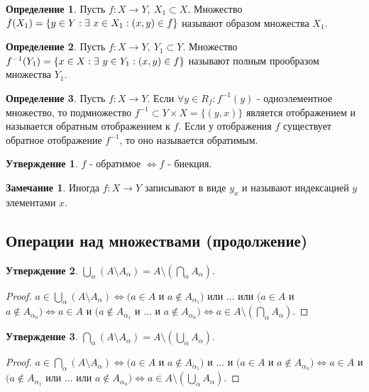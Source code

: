 \documentclass[a4paper, 12pt]{article}
\newcommand{\lra}{\Leftrightarrow}
\theoremstyle{definition}
\newtheorem*{definition}{Определение}
\newtheorem*{comm}{Замечание}
\newtheorem*{statement}{Утверждение}
\begin{document}
        \begin{definition}
            Пусть $f:X\to Y,\ X_1\subset X$. Множество $f(X_1)=\\ \{y\in Y: \exists\ x\in X_1 : (x,y)\in f\}$ называют образом множества $X_1$.
        \end{definition}
        \begin{definition}
            Пусть $f:X\to Y,\ Y_1\subset Y$. Множество $f^{-1}(Y_1)=\\ \{x\in X: \exists\ y\in Y_1 : (x,y)\in f\}$ называют полным прообразом множества $Y_1$.
        \end{definition}
        \begin{definition}
            Пусть $f:X\to Y$. Если $\forall y\in R_f: f^{-1}(y)$ - одноэлементное множество, то подмножество $f^{-1}\subset Y\times X=\{(y,x)\}$ является отображением и называется обратным отображением к $f$. Если у отображения $f$ существует обратное отображение $f^{-1}$, то оно называется обратимым.
        \end{definition}
        \begin{statement}
            $f$ - обратимое $\lra f$ - биекция.
        \end{statement}
        \begin{comm}
        Иногда $f: X\to Y$ записывают в виде $y_x$ и называют индексацией $y$ элементами $x$.
        \end{comm}
    \subsection{Операции над множествами (продолжение)}
        \begin{statement}
            $\bigcup\limits_{\alpha}(A\setminus A_{\alpha}) = A\setminus (\bigcap\limits_{\alpha}A_{\alpha})$.
        \end{statement}
        \begin{proof}
            $a\in \bigcup\limits_{\alpha}(A\setminus A_{\alpha})\lra (a\in A$ и $a\notin A_{\alpha_1})$ или $\dots$ или $(a\in A$ и $a\notin A_{\alpha_n})\lra a\in A$ и $(a\notin A_{\alpha_1}$ и $\dots$ и $a\notin A_{\alpha_n})\lra a\in A\setminus (\bigcap\limits_{\alpha}A_{\alpha})$.
        \end{proof}
        \begin{statement}
            $\bigcap\limits_{\alpha}(A\setminus A_{\alpha}) = A\setminus (\bigcup\limits_{\alpha}A_{\alpha})$.
        \end{statement}
        \begin{proof}
            $a\in \bigcap\limits_{\alpha}(A\setminus A_{\alpha})\lra (a\in A$ и $a\notin A_{\alpha_1})$ и $\dots$ и $(a\in A$ и $a\notin A_{\alpha_n})\lra a\in A$ и $(a\notin A_{\alpha_1}$ или $\dots$ или $a\notin A_{\alpha_n})\lra a\in A\setminus (\bigcup\limits_{\alpha}A_{\alpha})$.
        \end{proof}
\end{document}
